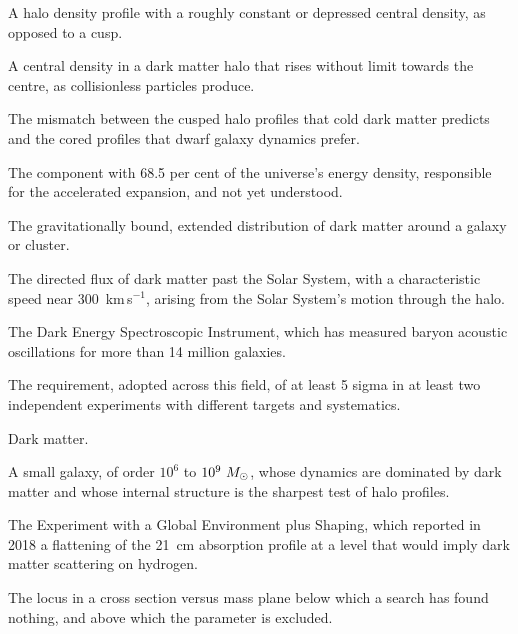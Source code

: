 \begin{description}[style=nextline,leftmargin=0pt,labelwidth=0pt,labelsep=0pt,
  font=\sffamily\bfseries\small,itemsep=5pt]
\item[Cored profile] A halo density profile with a roughly constant or
depressed central density, as opposed to a cusp.

\item[Cusp] A central density in a dark matter halo that rises without limit
towards the centre, as collisionless particles produce.

\item[Cusp-core problem] The mismatch between the cusped halo profiles that
cold dark matter predicts and the cored profiles that dwarf galaxy dynamics
prefer.

\item[Dark energy] The component with 68.5 per cent of the universe's
energy density, responsible for the accelerated expansion, and not yet
understood.

\item[Dark matter halo] The gravitationally bound, extended distribution of
dark matter around a galaxy or cluster.

\item[Dark matter wind] The directed flux of dark matter past the Solar
System, with a characteristic speed near 300~km\,s$^{-1}$, arising from
the Solar System's motion through the halo.

\item[DESI] The Dark Energy Spectroscopic Instrument, which has measured
baryon acoustic oscillations for more than 14 million galaxies.

\item[Discovery standard] The requirement, adopted across this field, of at
least 5 sigma in at least two independent experiments with different targets
and systematics.

\item[DM] Dark matter.

\item[Dwarf galaxy] A small galaxy, of order $10^{6}$ to $10^{9}\ M_{\odot}$,
whose dynamics are dominated by dark matter and whose internal structure is
the sharpest test of halo profiles.

\item[EDGES] The Experiment with a Global Environment plus Shaping, which
reported in 2018 a flattening of the 21~cm absorption profile at a level
that would imply dark matter scattering on hydrogen.

\item[Exclusion curve] The locus in a cross section versus mass plane
below which a search has found nothing, and above which the parameter is
excluded.


\end{description}
